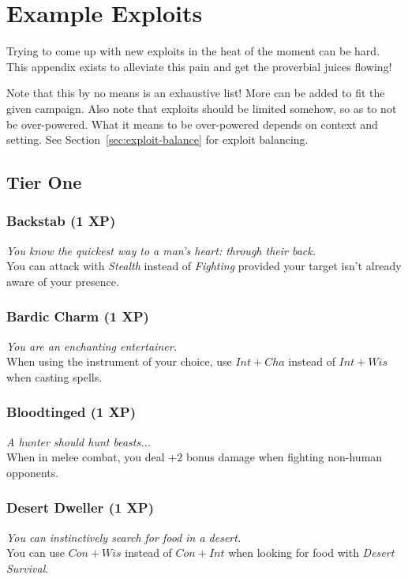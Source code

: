 \chapter{Example Exploits}\label{app:exploits}
Trying to come up with new exploits in the heat of the moment can be hard.
This appendix exists to alleviate this pain and get the proverbial juices flowing!

Note that this by no means is an exhaustive list!
More can be added to fit the given campaign.
Also note that exploits should be limited somehow, so as to not be over-powered. What it means to be over-powered depends on context and setting. See Section~\ref{sec:exploit-balance} for exploit balancing.

\section{Tier One}

\subsection*{Backstab (1 XP)}
\textit{You know the quickest way to a man's heart: through their back.}\\
You can attack with \textit{Stealth} instead of \textit{Fighting} provided your target isn't already aware of your presence.

\subsection*{Bardic Charm (1 XP)}
\textit{You are an enchanting entertainer.}\\
When using the instrument of your choice, use $Int+Cha$ instead of $Int+Wis$ when casting spells.

\subsection*{Bloodtinged (1 XP)}
\textit{A hunter should hunt beasts...}\\
When in melee combat, you deal $+2$ bonus damage when fighting non-human opponents.

\subsection*{Desert Dweller (1 XP)}
\textit{You can instinctively search for food in a desert.}\\
You can use $Con + Wis$ instead of $Con + Int$ when looking for food with \textit{Desert Survival}.

